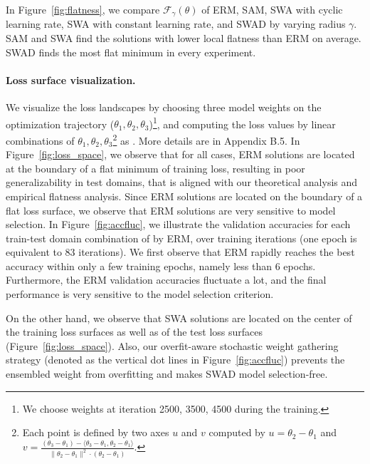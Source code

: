 In Figure~\ref{fig:flatness}, we compare $\mathcal{F}_\gamma(\theta)$ of ERM, SAM, SWA with cyclic learning rate, SWA with constant learning rate, and SWAD by varying radius $\gamma$.
SAM and SWA find the solutions with lower local flatness than ERM on average.
SWAD finds the most flat minimum in every experiment.





\paragraph{Loss surface visualization.}
We visualize the loss landscapes by choosing three model weights on the optimization trajectory ($\theta_1, \theta_2, \theta_3$)\footnote{We choose weights at iteration 2500, 3500, 4500 during the training.}, and computing the loss values by linear combinations of $\theta_1, \theta_2, \theta_3$\footnote{Each point is defined by two axes $u$ and $v$ computed by $u=\theta_2 - \theta_1$ and $v=\frac{(\theta_3 - \theta_1)- \langle \theta_3 - \theta_1, \theta_2 - \theta_1 \rangle}{\|\theta_2 - \theta_1 \|^2 \cdot (\theta_2 - \theta_1)}$.} as \cite{izmailov2018swa}.
More details are in Appendix B.5.
In Figure~\ref{fig:loss_space}, we observe that for all cases, ERM solutions are located at the boundary of a flat minimum of training loss, resulting in poor generalizability in test domains, that is aligned with our theoretical analysis and empirical flatness analysis.
Since ERM solutions are located on the boundary of a flat loss surface, we observe that ERM solutions are very sensitive to model selection.
In Figure~\ref{fig:accfluc}, we illustrate the validation accuracies for each train-test domain combination of  by ERM, over training iterations (one epoch is equivalent to 83 iterations).
We first observe that ERM rapidly reaches the best accuracy within only a few training epochs, namely less than 6 epochs.
Furthermore, the ERM validation accuracies fluctuate a lot, and the final performance is very sensitive to the model selection criterion.

On the other hand, we observe that SWA solutions are located on the center of the training loss surfaces as well as of the test loss surfaces (Figure~\ref{fig:loss_space}). Also, our overfit-aware stochastic weight gathering strategy (denoted as the vertical dot lines in Figure~\ref{fig:accfluc}) prevents the ensembled weight from overfitting and makes SWAD model selection-free.